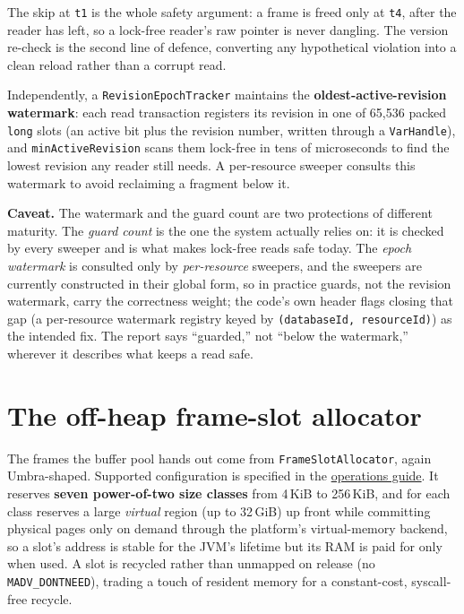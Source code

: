 \documentclass[11pt,a4paper,oneside]{report}
\theoremstyle{sirixthm}
\newcommand{\code}[1]{\texttt{#1}}
\begin{document}
\noindent The skip at \code{t1} is the whole safety argument: a frame is freed only at \code{t4}, after
the reader has left, so a lock-free reader's raw pointer is never dangling. The version re-check is the
second line of defence, converting any hypothetical violation into a clean reload rather than a corrupt
read.

Independently, a \code{RevisionEpochTracker} maintains the \textbf{oldest-active-revision watermark}:
each read transaction registers its revision in one of 65{,}536 packed \code{long} slots (an active bit
plus the revision number, written through a \code{VarHandle}), and \code{minActiveRevision} scans them
lock-free in tens of microseconds to find the lowest revision any reader still needs. A per-resource
sweeper consults this watermark to avoid reclaiming a fragment below it.

\begin{honesty}
\small\textbf{Caveat.} The watermark and the guard count are two protections of different maturity. The
\emph{guard count} is the one the system actually relies on: it is checked by every sweeper and is what
makes lock-free reads safe today. The \emph{epoch watermark} is consulted only by \emph{per-resource}
sweepers, and the sweepers are currently constructed in their global form, so in practice guards, not the
revision watermark, carry the correctness weight; the code's own header flags closing that gap (a
per-resource watermark registry keyed by \code{(databaseId, resourceId)}) as the intended fix. The
report says ``guarded,'' not ``below the watermark,'' wherever it describes what keeps a read safe.
\end{honesty}

\section{The off-heap frame-slot allocator}
\label{sec:allocator}

The frames the buffer pool hands out come from \code{FrameSlotAllocator}, again Umbra-shaped.
Supported configuration is specified in the
\href{operations.md\#4-cache-budgets}{operations guide}. It reserves \textbf{seven power-of-two size
classes} from 4\,KiB to 256\,KiB, and for each class reserves a large \emph{virtual} region (up to 32\,GiB)
up front while committing physical pages only on demand through the platform's virtual-memory backend,
so a slot's address is stable for the JVM's lifetime but its RAM is paid for only when used. A slot is
recycled rather than unmapped on release (no \code{MADV\_DONTNEED}), trading a touch of resident memory
for a constant-cost, syscall-free recycle.
\end{document}
